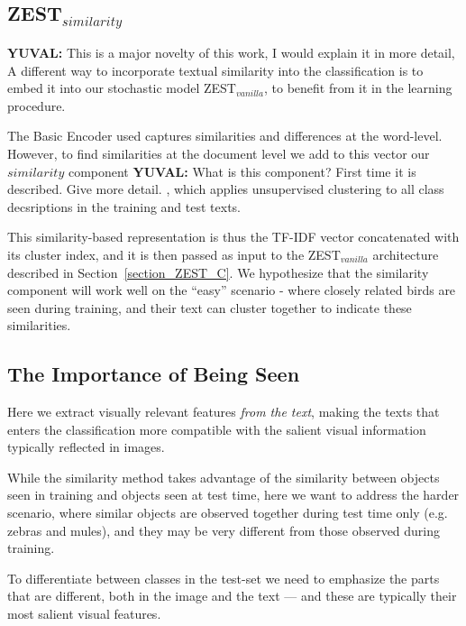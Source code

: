 \documentclass[11pt,a4paper]{article}
\newcommand\yuval[1]{\textcolor{darkpink}{\textbf{YUVAL:} #1 }}
\newcommand\reut[1]{\textcolor{green}{\textbf{REUT:} #1 }}
\begin{document}
\subsection{ZEST$_{similarity}$}
\yuval{This is a major novelty of this work, I would explain it in more detail, }
A different way to incorporate textual similarity into the classification is to embed it into our stochastic model ZEST$_{vanilla}$, to benefit from it in the learning procedure. %


The Basic Encoder used captures similarities and differences at the word-level. However, to find similarities at the document level we add to this vector our $similarity$ component \yuval{What is this component? First time it is described. Give more detail. }, which applies unsupervised clustering to  all class decsriptions in the training and test texts.   

This similarity-based representation is thus the TF-IDF vector concatenated with its cluster index, and it is then passed as  input to the ZEST$_{vanilla}$ architecture described in Section~\ref{section_ZEST_C}.  
We hypothesize that the similarity component will work well on the \enquote{easy} scenario - where closely related birds are seen during training,  and their text can cluster together to indicate these similarities.

\subsection{The Importance of Being Seen}

Here we extract visually relevant features \textit{from the text}, making the texts that enters the classification more compatible with the salient visual information typically reflected in images. 

While the similarity method takes advantage of the similarity between objects seen in training and objects seen at test time, here we want to address the harder scenario, where similar objects are observed together during test time only (e.g. zebras and mules), and they may be very different from those observed during training.  

To differentiate between  classes in the test-set we need to emphasize the parts that are  different, both in the image and the text --- and these are typically their most salient visual features. %
\end{document}
